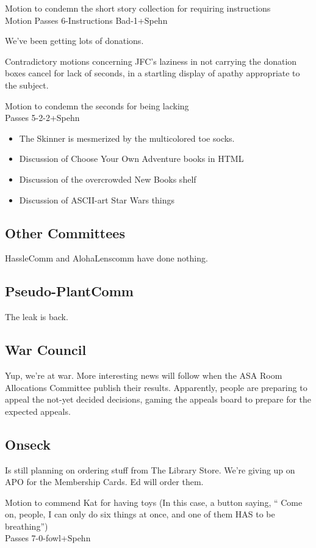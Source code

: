 \documentclass[10pt]{article}
\begin{document}
Motion to condemn the short story collection for requiring instructions\\
Motion Passes 6-Instructions Bad-1+Spehn

We've been getting lots of donations.

Contradictory motions concerning JFC's laziness in not carrying the
donation boxes cancel for lack of seconds, in a startling display of
apathy appropriate to the subject.

Motion to condemn the seconds for being lacking\\
Passes 5-2-2+Spehn

\begin{itemize}
\item The Skinner is mesmerized by the multicolored toe socks.
\item Discussion of Choose Your Own Adventure books in HTML
\item Discussion of the overcrowded New Books shelf
\item Discussion of ASCII-art Star Wars things
\end{itemize}

\subsection*{Other Committees}
HassleComm and AlohaLenscomm have done nothing.

\subsection*{Pseudo-PlantComm}
The leak is back.

\subsection*{War Council}
Yup, we're at war.
More interesting news will follow when the ASA Room Allocations
Committee publish their results.  Apparently, people are preparing to
appeal the not-yet decided decisions, gaming the appeals board to
prepare for the expected appeals.

\subsection*{Onseck}
Is still planning on ordering stuff from The Library Store.
We're giving up on APO for the Membership Cards. Ed will order them.

Motion to commend Kat for having toys (In this case, a button saying,
`` Come on, people, I can only do six things at once, and one of them
HAS to be breathing'')\\
Passes 7-0-fowl+Spehn
\end{document}
